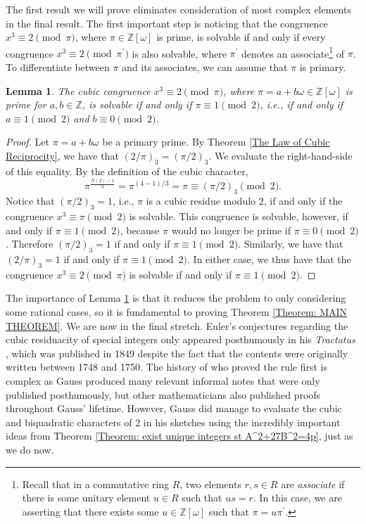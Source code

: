 \documentclass[10pt]{amsart}
\newcommand{\ZZ}{\mathbb{Z}}
\theoremstyle{plain}
\newtheorem{lemma}[thm]{Lemma}
\theoremstyle{definition}
\theoremstyle{remark}
\numberwithin{equation}{section}
\begin{document}
\indent The first result we will prove eliminates consideration of most complex elements in the final result. The first important step is noticing that the congruence $x^{3}\equiv 2\pmod{\pi}$, where $\pi\in\ZZ[\omega]$ is prime, is solvable if and only if every congruence $x^{3}\equiv 2\pmod{\pi^{\prime}}$ is also solvable, where $\pi^{\prime}$ denotes an associate\footnote{Recall that in a commutative ring $R$, two elements $r,s\in R$ are \textit{associate} if there is some unitary element $u\in R$ such that $us=r$. In this case, we are asserting that there exists some $u\in \ZZ[\omega]$ such that $\pi = u\pi^{\prime}$.\label{Footnote: associate congruences}} of $\pi$. To differentiate between $\pi$ and its associates, we can assume that $\pi$ is primary. 
\begin{lemma} \label{Lemma: pi=1 mod 2 for x^3=2 mod pi to be solvable}
    The cubic congruence $x^{3}\equiv 2\pmod{\pi}$, where $\pi=a+b\omega\in \ZZ[\omega]$ is prime for $a,b\in\ZZ$, is solvable if and only if $\pi\equiv 1\pmod{2}$, i.e., if and only if $a\equiv 1\pmod{2}$ and $b\equiv 0\pmod{2}$. 
\end{lemma}
\begin{proof}
    \indent Let $\pi=a+b\omega$ be a primary prime. By Theorem \ref{The Law of Cubic Reciprocity}, we have that $(2/\pi)_{3} = (\pi/2)_{3}$. We evaluate the right-hand-side of this equality. By the definition of the cubic character, 
    \begin{equation*}
        \pi^{\frac{N(2)-1}{3}} = \pi^{(4-1)/3} = \pi \equiv (\pi/2)_{3}\pmod{2}. 
    \end{equation*}
    Notice that $(\pi/2)_{3}=1$, i.e., $\pi$ is a cubic residue modulo $2$, if and only if the congruence $x^{3}\equiv \pi\pmod{2}$ is solvable. This congruence is solvable, however, if and only if $\pi\equiv 1\pmod{2}$, because $\pi$ would no longer be prime if $\pi\equiv 0\pmod{2}$. Therefore $(\pi/2)_{3}=1$ if and only if $\pi\equiv 1\pmod{2}$. Similarly, we have that $(2/\pi)_{3}=1$ if and only if $\pi\equiv 1\pmod{2}$. In either case, we thus have that the congruence $x^{3}\equiv 2\pmod{\pi}$ is solvable if and only if $\pi\equiv 1\pmod{2}$. 
\end{proof}

The importance of Lemma \ref{Lemma: pi=1 mod 2 for x^3=2 mod pi to be solvable} is that it reduces the problem to only considering some rational cases, so it is fundamental to proving Theorem \ref{Theorem: MAIN THEOREM}. We are now in the final stretch. Euler's conjectures regarding the cubic residuacity of special integers only appeared posthumously in his \textit{Tractatus} \cite{euler1849tractatus}, which was published in 1849 despite the fact that the contents were originally written between 1748 and 1750. The history of who proved the rule first is complex as Gauss produced many relevant informal notes that were only published posthumously, but other mathematicians also published proofs throughout Gauss' lifetime. However, Gauss did manage to evaluate the cubic and biquadratic characters of 2 in his sketches \cite{gauss1900werke8article} using the incredibly important ideas from Theorem \ref{Theorem: exist unique integers st A^2+27B^2=4p}, just as we do now.
\end{document}
